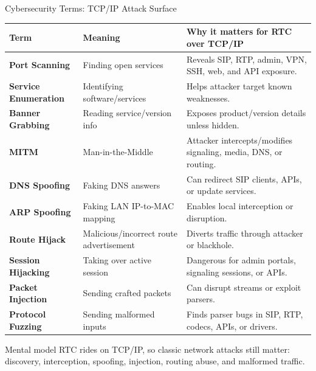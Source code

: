 \documentclass[aspectratio=169]{beamer}
\begin{document}
\begin{frame}{Cybersecurity Terms: TCP/IP Attack Surface}
\tiny
\begin{tabular}{p{2.2cm} p{3.5cm} p{6.5cm}}
\toprule
\textbf{Term} & \textbf{Meaning} & \textbf{Why it matters for RTC over TCP/IP} \\
\midrule
\textbf{Port Scanning} & Finding open services & Reveals SIP, RTP, admin, VPN, SSH, web, and API exposure. \\
\textbf{Service Enumeration} & Identifying software/services & Helps attacker target known weaknesses. \\
\textbf{Banner Grabbing} & Reading service/version info & Exposes product/version details unless hidden. \\
\textbf{MITM} & Man-in-the-Middle & Attacker intercepts/modifies signaling, media, DNS, or routing. \\
\textbf{DNS Spoofing} & Faking DNS answers & Can redirect SIP clients, APIs, or update services. \\
\textbf{ARP Spoofing} & Faking LAN IP-to-MAC mapping & Enables local interception or disruption. \\
\textbf{Route Hijack} & Malicious/incorrect route advertisement & Diverts traffic through attacker or blackhole. \\
\textbf{Session Hijacking} & Taking over active session & Dangerous for admin portals, signaling sessions, or APIs. \\
\textbf{Packet Injection} & Sending crafted packets & Can disrupt streams or exploit parsers. \\
\textbf{Protocol Fuzzing} & Sending malformed inputs & Finds parser bugs in SIP, RTP, codecs, APIs, or drivers. \\
\bottomrule
\end{tabular}

\vspace{0.15cm}
\begin{block}{Mental model}
RTC rides on TCP/IP, so classic network attacks still matter: discovery, interception, spoofing, injection, routing abuse, and malformed traffic.
\end{block}
\end{frame}
\end{document}
